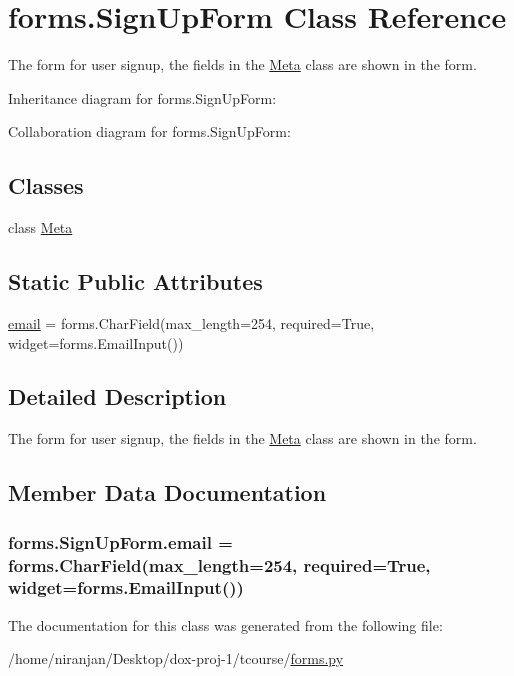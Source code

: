 \hypertarget{classforms_1_1_sign_up_form}{}\section{forms.\+Sign\+Up\+Form Class Reference}
\label{classforms_1_1_sign_up_form}


The form for user signup, the fields in the \hyperlink{classforms_1_1_sign_up_form_1_1_meta}{Meta} class are shown in the form.  




Inheritance diagram for forms.\+Sign\+Up\+Form\+:


Collaboration diagram for forms.\+Sign\+Up\+Form\+:
\subsection*{Classes}
\begin{DoxyCompactItemize}
\item 
class \hyperlink{classforms_1_1_sign_up_form_1_1_meta}{Meta}
\end{DoxyCompactItemize}
\subsection*{Static Public Attributes}
\begin{DoxyCompactItemize}
\item 
\hyperlink{classforms_1_1_sign_up_form_ae7e37b007fb740dcd1da06a8de6fcaea}{email} = forms.\+Char\+Field(max\+\_\+length=254, required=True, widget=forms.\+Email\+Input())
\end{DoxyCompactItemize}


\subsection{Detailed Description}
The form for user signup, the fields in the \hyperlink{classforms_1_1_sign_up_form_1_1_meta}{Meta} class are shown in the form. 

\subsection{Member Data Documentation}
\subsubsection[{\texorpdfstring{email}{email}}]{\setlength{\rightskip}{0pt plus 5cm}forms.\+Sign\+Up\+Form.\+email = forms.\+Char\+Field(max\+\_\+length=254, required=True, widget=forms.\+Email\+Input())\hspace{0.3cm}{\ttfamily [static]}}\hypertarget{classforms_1_1_sign_up_form_ae7e37b007fb740dcd1da06a8de6fcaea}{}\label{classforms_1_1_sign_up_form_ae7e37b007fb740dcd1da06a8de6fcaea}


The documentation for this class was generated from the following file\+:\begin{DoxyCompactItemize}
\item 
/home/niranjan/\+Desktop/dox-\/proj-\/1/tcourse/\hyperlink{forms_8py}{forms.\+py}\end{DoxyCompactItemize}
